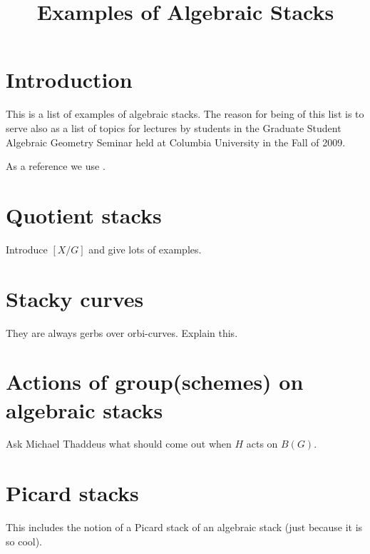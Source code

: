 

%


\title{Examples of Algebraic Stacks}


\maketitle

\label{section-phantom}

\tableofcontents

\section{Introduction}
\label{section-introduction}

\noindent
This is a list of examples of algebraic stacks.
The reason for being of this list is to serve also as a list of
topics for lectures by students in the Graduate Student Algebraic Geometry
Seminar held at Columbia University in the Fall of 2009.

\medskip\noindent
As a reference we use \cite[Section 4]{DM}.


\section{Quotient stacks}
\label{section-quotient-stacks}

\noindent
Introduce $[X/G]$ and give lots of examples.

\section{Stacky curves}
\label{section-stacky-curves}

\noindent
They are always gerbs over orbi-curves.
Explain this.

\section{Actions of group(schemes) on algebraic stacks}
\label{section-actions}

\noindent
Ask Michael Thaddeus what should come out when
$H$ acts on $B(G)$.

\section{Picard stacks}
\label{section-picard}

\noindent
This includes the notion of a Picard stack of an
algebraic stack (just because it is so cool).


